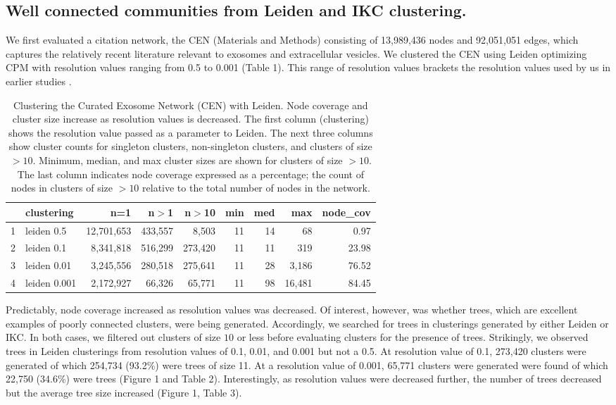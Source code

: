 \documentclass[12pt, oneside]{article}   	%
\begin{document}
\subsection{Well connected communities from Leiden and IKC clustering.}

We first evaluated a citation network, the CEN (Materials and Methods) consisting of 13,989,436 nodes and 92,051,051 edges, which captures the relatively recent literature relevant to exosomes and extracellular vesicles. We clustered the CEN using Leiden optimizing CPM with resolution values ranging from 0.5 to 0.001 (Table 1). This range of resolution values brackets the resolution values used by us in earlier studies \citep{Wedell2022,Jakatdar_2022}. 

\begin{table}[ht]
\centering
\begin{tabular}{rlrrrrrrr}
  \hline
 & clustering & n=1 & n$>$1 & n$>$10 & min & med & max & node\_cov \\ 
  \hline
1 & leiden 0.5 & 12,701,653 & 433,557 & 8,503 & 11 & 14 & 68 & 0.97 \\ 
  2 & leiden 0.1 & 8,341,818 & 516,299 & 273,420 & 11 & 11 & 319 & 23.98 \\ 
  3 & leiden 0.01 & 3,245,556 & 280,518 & 275,641 & 11 & 28 & 3,186 & 76.52 \\ 
  4 & leiden 0.001 & 2,172,927 & 66,326 & 65,771 & 11 & 98 & 16,481 & 84.45 \\ 
   \hline
\end{tabular}
\caption{Clustering the Curated Exosome Network (CEN) with Leiden. Node coverage and cluster size increase as resolution values is decreased. The first column (clustering) shows the resolution value passed as a parameter to Leiden. The next three columns show cluster counts for singleton clusters, non-singleton clusters, and clusters of size $>10$. Minimum, median, and max cluster sizes are shown for clusters of size $>10$. The last column indicates node coverage expressed as a percentage; the count of nodes in clusters of size $>10$ relative to the total number of nodes in the network. }
\label{tab: table1}
\end{table}

Predictably, node coverage increased as resolution values was decreased. Of interest, however, was whether trees, which are excellent examples of poorly connected clusters, were being generated. Accordingly, we searched for trees in clusterings generated by either Leiden or IKC. In both cases, we filtered out clusters of size $10$ or less before evaluating clusters for the presence of trees. Strikingly, we observed trees in Leiden clusterings from resolution values of 0.1, 0.01, and 0.001 but not a 0.5. At resolution value of 0.1, 273,420 clusters were generated of which 254,734 (93.2\%) were trees of size 11. At a resolution value of 0.001, 65,771 clusters were generated were found of which 22,750 (34.6\%) were trees (Figure 1 and Table 2). Interestingly, as resolution values were decreased further, the number of trees decreased but the average tree size increased (Figure 1, Table 3). 
\end{document}
